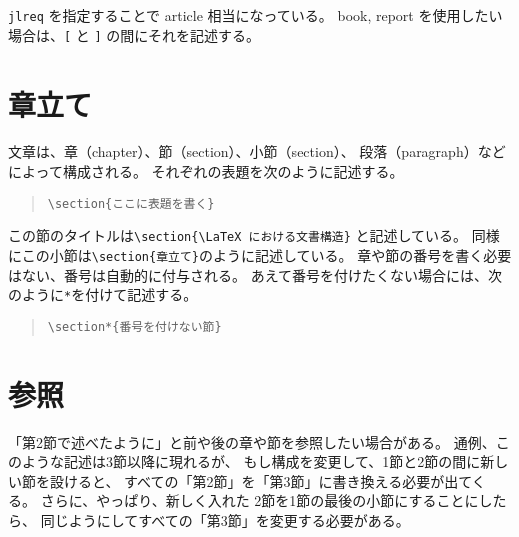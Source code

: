 \documentclass[fontsize=12pt, paper=a4]{jlreq}
\begin{document}
\verb+jlreq+ を指定することで article 相当になっている。
book, report を使用したい場合は、\verb+[+ と \verb+]+ の間にそれを記述する。


\section{章立て}

文章は、章（chapter）、節（section）、小節（section）、
段落（paragraph）などによって構成される。
それぞれの表題を次のように記述する。

\begin{quote}
\begin{verbatim}
\section{ここに表題を書く}
\end{verbatim}
\end{quote}

この節のタイトルは\verb|\section{\LaTeX における文書構造}|
と記述している。
同様にこの小節は\verb|\section{章立て}|のように記述している。
章や節の番号を書く必要はない、番号は自動的に付与される。
あえて番号を付けたくない場合には、次のように\verb|*|を付けて記述する。

\begin{quote}
\begin{verbatim}
\section*{番号を付けない節}
\end{verbatim}
\end{quote}


\section{参照}

「第2節で述べたように」と前や後の章や節を参照したい場合がある。
通例、このような記述は3節以降に現れるが、
もし構成を変更して、1節と2節の間に新しい節を設けると、
すべての「第2節」を「第3節」に書き換える必要が出てくる。
さらに、やっぱり、新しく入れた
2節を1節の最後の小節にすることにしたら、
同じようにしてすべての「第3節」を変更する必要がある。
\end{document}
